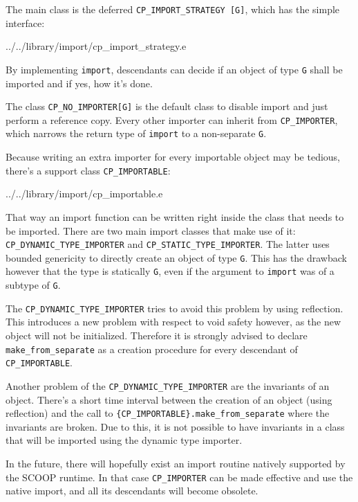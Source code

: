 \documentclass[a4paper,10pt]{report}
\begin{document}
The main class is the deferred \lstinline!CP_IMPORT_STRATEGY [G]!, which has the simple interface:


 {../../library/import/cp_import_strategy.e}

By implementing \lstinline!import!, descendants can decide if an object of type \lstinline!G! shall be imported and if yes, how it's done.

The class \lstinline!CP_NO_IMPORTER[G]! is the default class to disable import and just perform a reference copy.
Every other importer can inherit from \lstinline!CP_IMPORTER!, which narrows the return type of \lstinline!import! to a non-separate \lstinline!G!.

Because writing an extra importer for every importable object may be tedious, there's a support class \lstinline!CP_IMPORTABLE!:

 {../../library/import/cp_importable.e}

That way an import function can be written right inside the class that needs to be imported.
There are two main import classes that make use of it: \lstinline!CP_DYNAMIC_TYPE_IMPORTER! and \lstinline!CP_STATIC_TYPE_IMPORTER!.
The latter uses bounded genericity to directly create an object of type \lstinline!G!.
This has the drawback however that the type is statically \lstinline!G!, even if the argument to \lstinline!import! was of a subtype of \lstinline!G!.

The \lstinline!CP_DYNAMIC_TYPE_IMPORTER! tries to avoid this problem by using reflection.
This introduces a new problem with respect to void safety however, as the new object will not be initialized.
Therefore it is strongly advised to declare \lstinline!make_from_separate! as a creation procedure for every descendant of \lstinline!CP_IMPORTABLE!.

Another problem of the \lstinline!CP_DYNAMIC_TYPE_IMPORTER! are the invariants of an object.
There's a short time interval between the creation of an object (using reflection) and the call to \lstinline!{CP_IMPORTABLE}.make_from_separate! where the invariants are broken.
Due to this, it is not possible to have invariants in a class that will be imported using the dynamic type importer.

In the future, there will hopefully exist an import routine natively supported by the SCOOP runtime.
In that case \lstinline!CP_IMPORTER! can be made effective and use the native import, and all its descendants will become obsolete.
\end{document}
